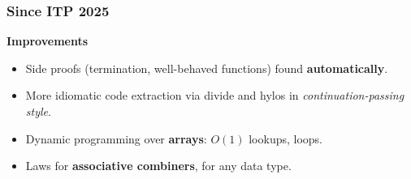
\begin{frame}[vertical-alignment = top]
  \frametitle{Since ITP 2025}
  \vspace*{8mm}
  \textbf{Improvements}
  \begin{itemize}
    \item<1-> Side proofs (termination, well-behaved functions) found
      \textbf{automatically}.
    \item<2-> More idiomatic code extraction via divide and hylos in
      \emph{continuation-passing style}.
  \end{itemize}
  \begin{itemize}
    \item<3-> Dynamic programming over \textbf{arrays}: $O(1)$ lookups,
      loops.
    \item<4-> Laws for \textbf{associative combiners}, for any data type.
  \end{itemize}
\end{frame}

